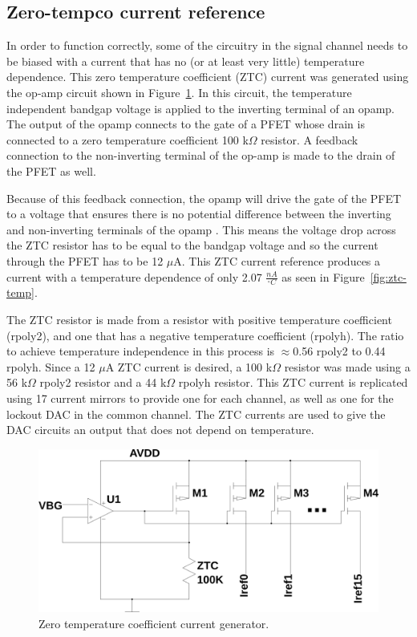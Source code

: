 \documentclass[12pt,oneside,final]{siuethesis}
\theoremstyle{definition}
\begin{document}
\subsection{Zero-tempco current reference}
\par In order to function correctly, some of the circuitry in the signal channel needs to be biased with a current that has no (or at least very little) temperature dependence. This zero temperature coefficient (ZTC) current was generated using the op-amp circuit shown in Figure~\ref{fig:ztc}. In this circuit, the temperature independent bandgap voltage is applied to the inverting terminal of an opamp. The output of the opamp connects to the gate of a PFET whose drain is connected to a zero temperature coefficient 100 k$\Omega$ resistor. A feedback connection to the non-inverting terminal of the op-amp is made to the drain of the PFET as well. 
\par Because of this feedback connection, the opamp will drive the gate of the PFET to a voltage that ensures there is no potential difference between the inverting and non-inverting terminals of the opamp \cite{BAKER}. This means the voltage drop across the ZTC resistor has to be equal to the bandgap voltage and so the current through the PFET has to be 12 $\mu$A. This ZTC current reference produces a current with a temperature dependence of only 2.07 $\frac{nA}{^{\circ}C}$ as seen in Figure~\ref{fig:ztc-temp}.
\par The ZTC resistor is made from a resistor with positive temperature coefficient (rpoly2), and one that has a negative temperature coefficient (rpolyh). The ratio to achieve temperature independence in this process is $\approx$0.56 rpoly2 to 0.44 rpolyh. Since a 12 $\mu$A ZTC current is desired, a 100 k$\Omega$ resistor was made using a 56 k$\Omega$ rpoly2 resistor and a 44 k$\Omega$ rpolyh resistor. This ZTC current is replicated using 17 current mirrors to provide one for each channel, as well as one for the lockout DAC in the common channel. The ZTC currents are used to give the DAC circuits an output that does not depend on temperature.
\begin{figure}[htbp!]
\centering
\includegraphics[scale=.35,keepaspectratio=true]{../LTspice_Drawings/ztc_iref/circuit.png} 
\caption{Zero temperature coefficient current generator.}
\label{fig:ztc}
\end{figure}
\end{document}
